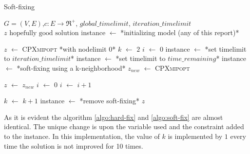 \begin{algorithm}
	\caption{Soft-fixing}\label{algo:soft-fix}
	\begin{algorithmic}[1]
		\Require $G=(V,E)$,$ c:E\rightarrow \Re^+$, $global\_timelimit$, $iteration\_timelimit$
		\Ensure $z\text{ hopefully good solution}$
		\State instance $\gets$ *initializing model (any of this report)*
		
		\State  $z$ $\gets$ \textsc{CPXmipopt} *with nodelimit 0*
		\State $k$ $\gets$ $2$
		\State $i$ $\gets$ $0$
		\State instance $\gets$ *set timelimit to $iteration\_timelimit$*
		\Else 
		\State instance $\gets$ *set timelimit to $time\_remaining$*
		\EndIf
		\State instance $\gets$ *soft-fixing using a k-neighborhood*
		\State $z_{new}$ $\gets$ \textsc{CPXmipopt}
		
		\State $z$ $\gets$ $z_{new}$
		\State $i$ $\gets$ $0$
		\Else 
		\State $i$ $\gets$ $i+1$
		\EndIf
		
		\State $k$ $\gets$ $k + 1$
		\EndIf
		\State instance $\gets$ *remove soft-fixing*
		\EndWhile
		\State \Return $z$
	\end{algorithmic}
\end{algorithm}

As it is evident the algorithm \ref{algo:hard-fix} and \ref{algo:soft-fix} are almost identical. The unique change is upon the variable used and the constraint added to the instance. In this implementation, the value of $k$ is implemented by $1$ every time the solution is not improved for 10 times.